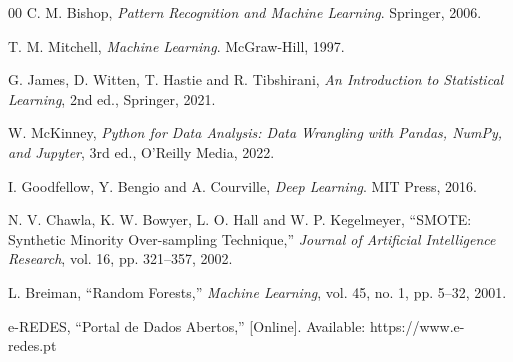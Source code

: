 \documentclass[conference]{IEEEtran}
\begin{document}
\begin{thebibliography}{00}
C. M. Bishop,
\textit{Pattern Recognition and Machine Learning}.
Springer, 2006.
 
T. M. Mitchell,
\textit{Machine Learning}.
McGraw-Hill, 1997.
 
G. James, D. Witten, T. Hastie and R. Tibshirani,
\textit{An Introduction to Statistical Learning},
2nd ed., Springer, 2021.
 
W. McKinney,
\textit{Python for Data Analysis: Data Wrangling with Pandas, NumPy,
and Jupyter},
3rd ed., O'Reilly Media, 2022.
 
I. Goodfellow, Y. Bengio and A. Courville,
\textit{Deep Learning}.
MIT Press, 2016.
 
N. V. Chawla, K. W. Bowyer, L. O. Hall and W. P. Kegelmeyer,
``SMOTE: Synthetic Minority Over-sampling Technique,''
\textit{Journal of Artificial Intelligence Research},
vol. 16, pp. 321--357, 2002.
 
L. Breiman,
``Random Forests,''
\textit{Machine Learning},
vol. 45, no. 1, pp. 5--32, 2001.
 
e-REDES,
``Portal de Dados Abertos,''
[Online]. Available: https://www.e-redes.pt
\end{thebibliography}
\end{document}
